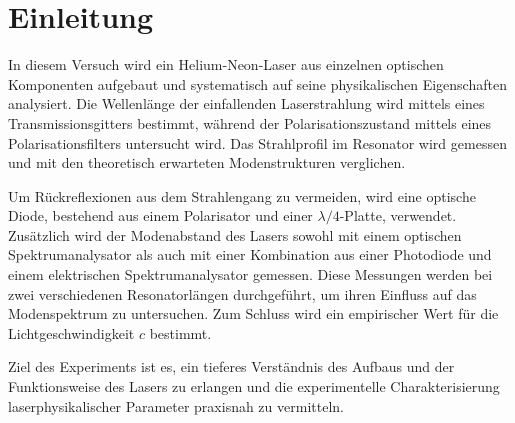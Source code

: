\chapter{Einleitung}
In diesem Versuch wird ein Helium-Neon-Laser aus einzelnen optischen Komponenten aufgebaut und systematisch auf seine physikalischen Eigenschaften analysiert. Die Wellenlänge der einfallenden Laserstrahlung wird mittels eines Transmissionsgitters bestimmt, während der Polarisationszustand mittels eines Polarisationsfilters untersucht wird. Das Strahlprofil im Resonator wird gemessen und mit den theoretisch erwarteten Modenstrukturen verglichen.

Um Rückreflexionen aus dem Strahlengang zu vermeiden, wird eine optische Diode, bestehend aus einem Polarisator und einer $\lambda/4$-Platte, verwendet. Zusätzlich wird der Modenabstand des Lasers sowohl mit einem optischen Spektrumanalysator als auch mit einer Kombination aus einer Photodiode und einem elektrischen Spektrumanalysator gemessen. Diese Messungen werden bei zwei verschiedenen Resonatorlängen durchgeführt, um ihren Einfluss auf das Modenspektrum zu untersuchen. Zum Schluss wird ein empirischer Wert für die Lichtgeschwindigkeit $c$ bestimmt.

Ziel des Experiments ist es, ein tieferes Verständnis des Aufbaus und der Funktionsweise des Lasers zu erlangen und die experimentelle Charakterisierung laserphysikalischer Parameter praxisnah zu vermitteln.
